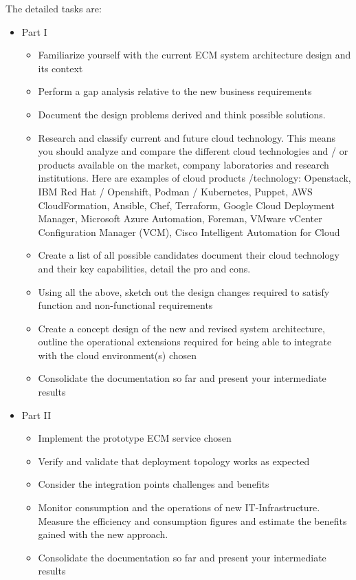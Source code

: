 The detailed tasks are:
\begin{itemize}
\item Part I 
\begin{itemize}
\item Familiarize yourself with the current ECM system architecture design and its context
\item Perform a gap analysis relative to the new business requirements 
\item Document the design problems derived and think possible solutions.       
\item Research and classify current and future cloud technology. 
This means you should analyze and compare the different cloud technologies and / or products available on the market, company laboratories and research institutions. Here are examples of cloud products /technology: 
Openstack, IBM Red Hat / Openshift, Podman / Kubernetes, Puppet, AWS CloudFormation, Ansible, Chef, Terraform, Google Cloud Deployment Manager, Microsoft Azure Automation, Foreman, VMware vCenter Configuration Manager (VCM), Cisco Intelligent Automation for Cloud
\item Create a list of all possible candidates document their cloud technology and their key capabilities, detail the pro and cons. 	  
\item Using all the above, sketch out the design changes required to satisfy function and non-functional requirements
\item Create a concept design of  the new and revised system architecture, outline the operational extensions required for being able to integrate with the cloud environment(s) chosen
\item Consolidate the documentation so far and present your intermediate results
    \end{itemize}
\item Part II 
    \begin{itemize}
    \item Implement the prototype ECM service chosen
    \item Verify and validate that deployment topology works as expected
    \item Consider the integration points challenges and benefits
    \item Monitor consumption and the operations of new IT-Infrastructure. 
    Measure the efficiency and consumption figures and estimate the benefits
    gained with the new approach. 
    \item Consolidate the documentation so far and present your intermediate results

\end{itemize}
\end{itemize}
